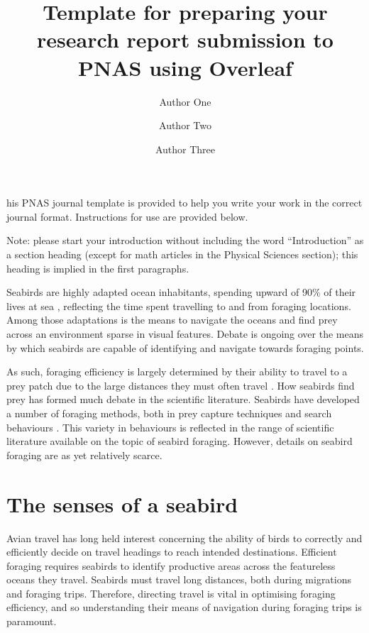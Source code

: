 \documentclass[9pt,twocolumn,twoside,lineno]{pnas-new}
\title{Template for preparing your research report submission to PNAS using Overleaf}
\author[a,c,1]{Author One}
\author[b,1,2]{Author Two}
\author[a]{Author Three}
\affil[a]{Affiliation One}
\affil[b]{Affiliation Two}
\affil[c]{Affiliation Three}
\begin{document}
\maketitle
\thispagestyle{firststyle}

his PNAS journal template is provided to help you write your work in the correct journal format. Instructions for use are provided below. 

Note: please start your introduction without including the word ``Introduction'' as a section heading (except for math articles in the Physical Sciences section); this heading is implied in the first paragraphs. 

Seabirds are highly adapted ocean inhabitants, spending upward of 90\% of their lives at sea \citep{Balance_2019}, reflecting the time spent travelling to and from foraging locations. Among those adaptations is the means to navigate the oceans and find prey across an environment sparse in visual features. Debate is ongoing over the means by which seabirds are capable of identifying and navigate towards foraging points. 

As such, foraging efficiency is largely determined by their ability to travel to a prey patch due to the large distances they must often travel \citep{Weimerskirch_2003}. How seabirds find prey has formed much debate in the scientific literature. Seabirds have developed a number of foraging methods, both in prey capture techniques and search behaviours \citep{Shealer_2001}. This variety in behaviours is reflected in the range of scientific literature available on the topic of seabird foraging. However, details on seabird foraging are as yet relatively scarce. 

\section{The senses of a seabird}
Avian travel has long held interest concerning the ability of birds to correctly and efficiently decide on travel headings to reach intended destinations. Efficient foraging requires seabirds to identify productive areas across the featureless oceans they travel. Seabirds must travel long distances, both during migrations and foraging trips. Therefore, directing travel is vital in optimising foraging efficiency, and so understanding their means of navigation during foraging trips is paramount.
\end{document}
